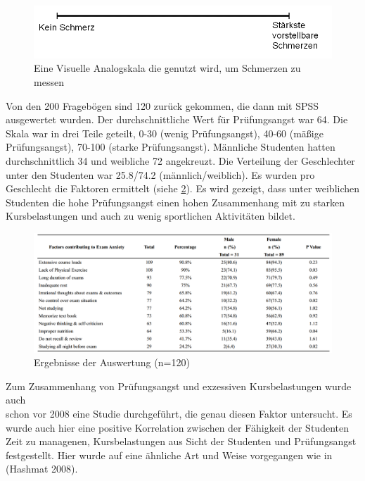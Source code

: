\documentclass[11pt, a4paper]{article}
\begin{document}
	\begin{figure}[p]
		\centering
		\includegraphics{img/VAS.png}
		\caption{Eine Visuelle Analogskala die genutzt wird, um Schmerzen zu messen \cite{hashmat2008factors}}
		\label{fig:vas}
	\end{figure}

	Von den 200 Fragebögen sind 120 zurück gekommen, die dann mit SPSS ausgewertet wurden. Der durchschnittliche Wert für Prüfungsangst war 64. Die Skala war in drei Teile geteilt, 0-30 (wenig Prüfungsangst), 40-60 (mäßige Prüfungsangst), 70-100 (starke Prüfungsangst). Männliche Studenten hatten durchschnittlich 34 und weibliche 72 angekreuzt. Die Verteilung der Geschlechter unter den Studenten war 25.8/74.2 (männlich/weiblich). Es wurden pro Geschlecht die Faktoren ermittelt (siehe \cref{fig:jpmatable}). Es wird gezeigt, dass unter weiblichen Studenten die hohe Prüfungsangst einen hohen Zusammenhang mit zu starken Kursbelastungen und auch zu wenig sportlichen Aktivitäten bildet. \cite{hashmat2008factors}

	\begin{figure}[p]
		\centering
		\includegraphics[scale=0.5]{img/jpma_table.png}
		\caption{Ergebnisse der Auswertung (n=120) \cite{hashmat2008factors}}
		\label{fig:jpmatable}
	\end{figure}

	Zum Zusammenhang von Prüfungsangst und exzessiven Kursbelastungen wurde auch \\schon vor 2008 eine Studie durchgeführt, die genau diesen Faktor untersucht. Es wurde auch hier eine positive Korrelation zwischen der Fähigkeit der Studenten Zeit zu managenen, Kursbelastungen aus Sicht der Studenten und Prüfungsangst festgestellt. Hier wurde auf eine ähnliche Art und Weise vorgegangen wie in (Hashmat 2008). \cite{sansgiry2006effect}
\end{document}
